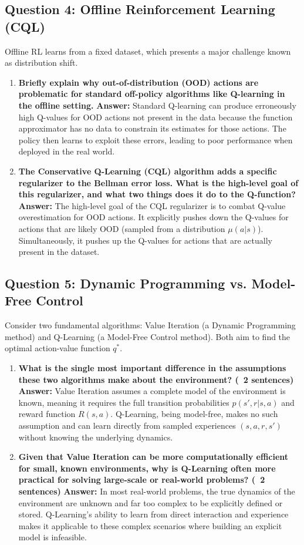 \documentclass[12pt]{article}
\begin{document}
\subsection*{Question 4: Offline Reinforcement Learning (CQL)}
Offline RL learns from a fixed dataset, which presents a major challenge known as distribution shift.
\begin{enumerate}
    \item \textbf{Briefly explain why out-of-distribution (OOD) actions are problematic for standard off-policy algorithms like Q-learning in the offline setting.}
    \textbf{Answer:} Standard Q-learning can produce erroneously high Q-values for OOD actions not present in the data because the function approximator has no data to constrain its estimates for those actions. The policy then learns to exploit these errors, leading to poor performance when deployed in the real world.
    \item \textbf{The Conservative Q-Learning (CQL) algorithm adds a specific regularizer to the Bellman error loss. What is the high-level goal of this regularizer, and what two things does it do to the Q-function?}
    \textbf{Answer:} The high-level goal of the CQL regularizer is to combat Q-value overestimation for OOD actions. It explicitly pushes down the Q-values for actions that are likely OOD (sampled from a distribution $\mu(a|s)$). Simultaneously, it pushes up the Q-values for actions that are actually present in the dataset.
\end{enumerate}

\subsection*{Question 5: Dynamic Programming vs. Model-Free Control}
Consider two fundamental algorithms: Value Iteration (a Dynamic Programming method) and Q-Learning (a Model-Free Control method). Both aim to find the optimal action-value function $q^*$.
\begin{enumerate}
    \item \textbf{What is the single most important difference in the assumptions these two algorithms make about the environment? (~2 sentences)}
    \textbf{Answer:} Value Iteration assumes a complete model of the environment is known, meaning it requires the full transition probabilities $p(s',r|s,a)$ and reward function $R(s,a)$. Q-Learning, being model-free, makes no such assumption and can learn directly from sampled experiences $(s, a, r, s')$ without knowing the underlying dynamics.
    \item \textbf{Given that Value Iteration can be more computationally efficient for small, known environments, why is Q-Learning often more practical for solving large-scale or real-world problems? (~2 sentences)}
    \textbf{Answer:} In most real-world problems, the true dynamics of the environment are unknown and far too complex to be explicitly defined or stored. Q-Learning's ability to learn from direct interaction and experience makes it applicable to these complex scenarios where building an explicit model is infeasible.
\end{enumerate}
\end{document}
